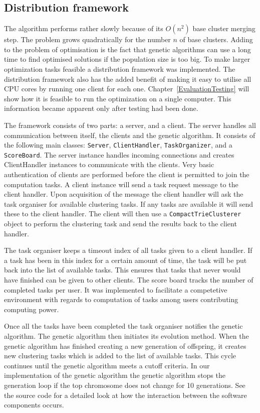 \subsection{Distribution framework}
The \CTC algorithm performs rather slowly because of its \(O(n^2)\) base cluster merging step. The problem grows quadratically for the number \(n\) of base clusters. Adding to the problem of optimisation is the fact that genetic algorithms can use a long time to find optimised solutions if the population size is too big. To make larger optimization tasks feasible a distribution framework was implemented. The distribution framework also has the added benefit of making it easy to utilise all CPU cores by running one client for each one. Chapter~\ref{EvaluationTesting} will show how it is feasible to run the optimization on a single computer. This information became apparent only after testing had been done.

The framework consists of two parts: a server, and a client. The server handles all communication between itself, the clients and the genetic algorithm. It consists of the following main classes: \texttt{Server}, \texttt{ClientHandler}, \texttt{TaskOrganizer}, and a \texttt{ScoreBoard}. The server instance handles incoming connections and creates ClientHandler instances to communicate with the clients. Very basic authentication of clients are performed before the client is permitted to join the computation tasks. A client instance will send a task request message to the client handler. Upon acquisition of the message the client handler will ask the task organiser for available clustering tasks. If any tasks are available it will send these to the client handler. The client will then use a \texttt{CompactTrieClusterer} object to perform the clustering task and send the results back to the client handler.

The task organiser keeps a timeout index of all tasks given to a client handler. If a task has been in this index for a certain amount of time, the task will be put back into the list of available tasks. This ensures that tasks that never would have finished can be given to other clients. The score board tracks the number of completed tasks per user. It was implemented to facilitate a competetive environment with regards to computation of tasks among users contributing computing power.

Once all the tasks have been completed the task organiser notifies the genetic algorithm. The genetic algorithm then initiates its evolution method. When the genetic algorithm has finished creating a new generation of offspring, it creates new clustering tasks which is added to the list of available tasks. This cycle continues until the genetic algorithm meets a cutoff criteria. In our implementation of the genetic algorithm the genetic algorithm stops the generation loop if the top chromosome does not change for 10 generations. See the source code for a detailed look at how the interaction between the software components occurs.